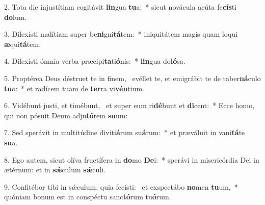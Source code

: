 2. Tota die injustítiam cogitávit \textbf{lin}gua \textbf{tu}a:~*  sicut novácula acúta fe\textbf{cís}ti \textbf{do}lum.\

3. Dilexísti malítiam super be\textbf{ni}gni\textbf{tá}tem:~*  iniquitátem magis quam loqui \textbf{æ}qui\textbf{tá}tem.\

4. Dilexísti ómnia verba præcipi\textbf{ta}ti\textbf{ó}nis:~*  \textbf{lin}gua do\textbf{ló}sa.\

5. Proptérea Deus déstruet te in finem, \dag\  evéllet te, et emigrábit te de taber\textbf{ná}culo \textbf{tu}o:~*  et radícem tuam de \textbf{ter}ra vi\textbf{vén}tium.\

6. Vidébunt justi, et timébunt, \dag\  et super eum ri\textbf{dé}bunt et \textbf{di}cent:~*  Ecce homo, qui non pósuit Deum adju\textbf{tó}rem \textbf{su}um:\

7. Sed sperávit in multitúdine diviti\textbf{á}rum su\textbf{á}rum:~*  et præváluit in vani\textbf{tá}te \textbf{su}a.\

8. Ego autem, sicut olíva fructífera in \textbf{do}mo \textbf{De}i:~*  sperávi in misericórdia Dei in ætérnum: et in \textbf{sǽ}culum \textbf{sǽ}culi.\

9. Confitébor tibi in sǽculum, quia fecísti: \dag\  et exspectábo \textbf{no}men \textbf{tu}um,~*  quóniam bonum est in conspéctu sanc\textbf{tó}rum tu\textbf{ó}rum.\


